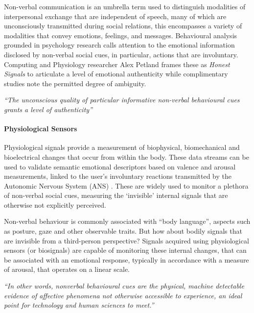 Non-verbal communication is an umbrella term used to distinguish modalities of interpersonal exchange that are independent of speech, many of which are unconsciously transmitted during social relations, this encompasses a variety of modalities that convey emotions, feelings, and messages. Behavioural analysis grounded in psychology research calls attention to the emotional information disclosed by non-verbal social cues, in particular, actions that are involuntary. Computing and Physiology researcher Alex Petland frames these as \textit{Honest Signals} to articulate a level of emotional authenticity while complimentary studies note the permitted degree of ambiguity.



\textit{“The unconscious quality of particular informative non-verbal behavioural cues grants a level of authenticity”} \citeauthor{pentland_honest_2010} \cite{pentland_honest_2010}

\paragraph{Physiological Sensors}

Physiological signals provide a measurement of biophysical, biomechanical and bioelectrical changes that occur from within the body. These data streams can be used to validate semantic emotional descriptors based on valence and arousal measurements, linked to the user’s involuntary reactions transmitted by the Autonomic Nervous System (ANS) \cite{levenson_autonomic_2014,shu_review_2018}. These are widely used to monitor a plethora of non-verbal social cues, measuring the ‘invisible’ internal signals that are otherwise not explicitly perceived.

Non-verbal behaviour is commonly associated with “body language”, aspects such as posture, gaze and other observable traits. But how about bodily signals that are invisible from a third-person perspective? Signals acquired using physiological sensors (or biosignals) are capable of monitoring these internal changes, that can be associated with an emotional response, typically in accordance with a measure of arousal, that operates on a linear scale.

\textit{“In other words, nonverbal behavioural cues are the physical, machine detectable evidence of affective phenomena not otherwise accessible to experience, an ideal point for technology and human sciences to meet.”} \citeauthor{vinciarelli_towards_2011} \cite{vinciarelli_towards_2011}


